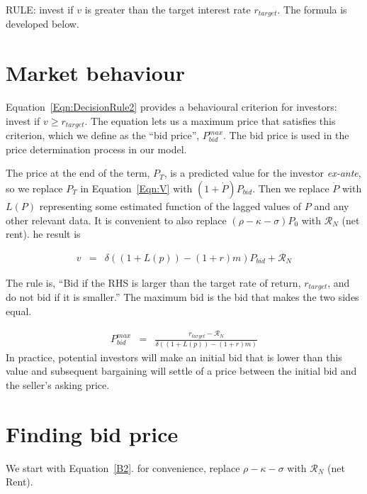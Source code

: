 RULE: invest if $v$ is greater than  the  target interest rate $r_{target}$. The formula is developed below.


\section{Market behaviour}
Equation~\ref{Eqn:DecisionRule2} provides a behavioural criterion for investors: invest if $v \geq r_{target}$. The equation lets us a  maximum price that satisfies this criterion, which we define as the ``bid price'', $P^{max}_{bid}$. The bid price is used in the price determination process in our model. 

The  price at the end of the term,  $P_T$, is a predicted value  for the investor \textit{ex-ante}, so we replace $P_T$ in Equation~\ref{Eqn:V} with $(1+\dot P)P_{bid}$. Then we replace $\dot P$ with $L(P)$ representing some estimated function of the lagged values of $P$ and any  other relevant data. It is  convenient to also replace $(\rho -\kappa - \sigma)P_0$ with $\mathcal{R}_N$ (net rent). he result is 

\begin{eqnarray}
v %
  &=&\delta\left( (1+L(p)) - (1+r)m \right) P_{bid} + \mathcal{R}_N  \nonumber
\end{eqnarray}

The rule is, ``Bid if the RHS is larger than the target rate of return, $r_{target}$, and do not bid if it is smaller.''  The maximum bid  is the bid that makes the two sides equal. 

\begin{eqnarray}
   P^{max}_{bid} &=&\frac{r_{target} - \mathcal{R}_N}{\delta\left((1+L(p)) - (1+r)m \right)} \label{EqBidPrice} 
\end{eqnarray}
In practice, potential investors will make an  initial  bid that is lower than this value and subsequent bargaining will settle of a price between the initial bid and the seller's asking price.


\section{Finding bid price}
We start with Equation~\ref{B2}. for convenience, replace $\rho -\kappa - \sigma $ with $\mathcal{R}_N$ (net Rent). 

